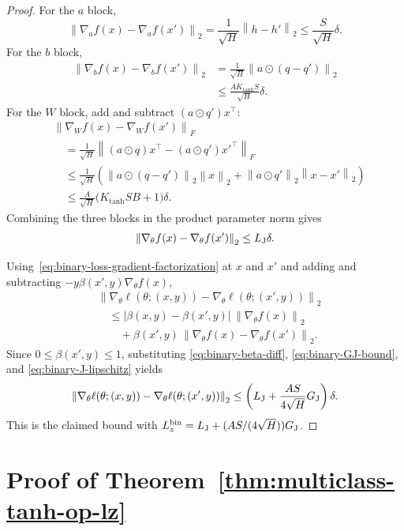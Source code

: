 \documentclass[conference,compsoc]{IEEEtran}
\newcommand{\norm}[1]{\left\lVert #1\right\rVert}
\begin{document}
\begin{proof}
For the $a$ block,
\[
\norm{\nabla_a f(x)-\nabla_a f(x')}_2
=
\frac1{\sqrt H}\norm{h-h'}_2
\le
\frac{S}{\sqrt H}\delta.
\]
For the $b$ block,
\begin{align*}
\norm{\nabla_b f(x)-\nabla_b f(x')}_2
&=
\frac1{\sqrt H}\norm{a\odot(q-q')}_2\\
&\le
\frac{AK_{\tanh}S}{\sqrt H}\delta.
\end{align*}
For the $W$ block, add and subtract $(a\odot q')x^\top$:
\begin{align*}
&\norm{\nabla_W f(x)-\nabla_W f(x')}_F\\
&\quad=
\frac1{\sqrt H}
\norm{(a\odot q)x^\top-(a\odot q')x'^\top}_F\\
&\quad\le
\frac1{\sqrt H}\left(
\norm{a\odot(q-q')}_2\norm{x}_2
+
\norm{a\odot q'}_2\norm{x-x'}_2
\right)\\
&\quad\le
\frac{A}{\sqrt H}\bigl(K_{\tanh}SB+1\bigr)\delta.
\end{align*}
Combining the three blocks in the product parameter norm gives
\begin{equation}
\label{eq:binary-J-lipschitz}
\norm{\nabla_\theta f(x)-\nabla_\theta f(x')}_2
\le
L_{\rm J}\delta.
\end{equation}

Using~\eqref{eq:binary-loss-gradient-factorization} at $x$ and $x'$ and adding
and subtracting $-y\beta(x',y)\nabla_\theta f(x)$,
\begin{align*}
&\norm{\nabla_\theta\ell(\theta;(x,y))
-
\nabla_\theta\ell(\theta;(x',y))}_2\\
&\quad\le
|\beta(x,y)-\beta(x',y)|\,\norm{\nabla_\theta f(x)}_2\\
&\qquad+
\beta(x',y)\,
\norm{\nabla_\theta f(x)-\nabla_\theta f(x')}_2.
\end{align*}
Since $0\le\beta(x',y)\le1$, substituting
\eqref{eq:binary-beta-diff}, \eqref{eq:binary-GJ-bound}, and
\eqref{eq:binary-J-lipschitz} yields
\[
\norm{\nabla_\theta\ell(\theta;(x,y))
-
\nabla_\theta\ell(\theta;(x',y))}_2
\le
\left(L_{\rm J}+\frac{AS}{4\sqrt H}G_{\rm J}\right)\delta.
\]
This is the claimed bound with $L_z^{\rm bin}=L_{\rm J}+(AS/(4\sqrt H))G_{\rm J}$.
\end{proof}

\section{Proof of Theorem~\ref{thm:multiclass-tanh-op-lz}}
\label{app:multiclass-tanh-proof}
\end{document}
